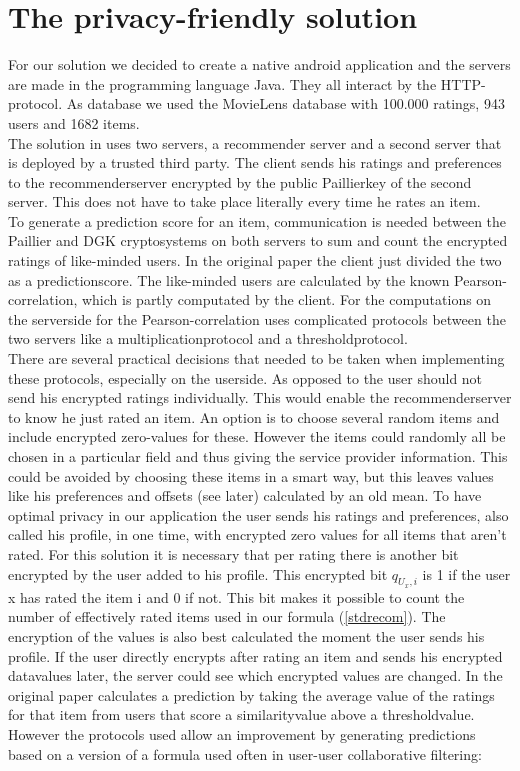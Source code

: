 \documentclass[twocolumn]{phdsymp} %
\begin{document}
\section{The privacy-friendly solution}
For our solution we decided to create a native android application and the servers are made in the programming language Java. They all interact by the HTTP-protocol. As database we used the MovieLens database with 100.000 ratings, 943 users and 1682 items.\\The solution in \cite{dyn} uses two servers, a recommender server and a second server that is deployed by a trusted third party. The client sends his ratings and preferences to the recommenderserver encrypted by the public Paillierkey of the second server. This does not have to take place literally every time he rates an item.\\To generate a prediction score for an item, communication is needed between the Paillier and DGK cryptosystems on both servers to sum and count the encrypted ratings of like-minded users. In the original paper \cite{dyn} the client just divided the two as a predictionscore. The like-minded users are calculated by the known Pearson-correlation, which is partly computated by the client. For the computations on the serverside for the Pearson-correlation \cite{dyn} uses complicated protocols between the two servers like a multiplicationprotocol and a thresholdprotocol. \\There are several practical decisions that needed to be taken when implementing these protocols, especially on the userside. As opposed to \cite{dyn} the user should not send his encrypted ratings individually. This would enable the recommenderserver to know he just rated an item. An option is to choose several random items and include encrypted zero-values for these. However the items could randomly all be chosen in a particular field and thus giving the service provider information. This could be avoided by choosing these items in a smart way, but this leaves values like his preferences and offsets (see later) calculated by an old mean. To have optimal privacy in our application the user sends his ratings and preferences, also called his profile, in one time, with encrypted zero values for all items that aren't rated. For this solution it is necessary that per rating there is another bit encrypted by the user added to his profile. This encrypted bit $ q_{U_x,i} $ is 1 if the user x has rated the item i and 0 if not. This bit makes it possible to count the number of effectively rated items used in our formula (\ref{stdrecom}). The encryption of the values is also best calculated the moment the user sends his profile. If the user directly encrypts after rating an item and sends his encrypted datavalues later,  the server could see which encrypted values are changed. In the original paper \cite{dyn} calculates a prediction by taking the average value of the ratings for that item from users that score a similarityvalue above a thresholdvalue. However the protocols used allow an improvement by generating predictions based on a version of a formula used often in user-user collaborative filtering:
\end{document}
